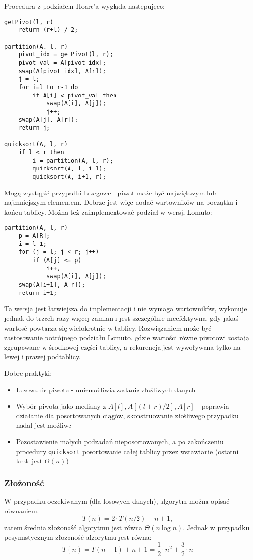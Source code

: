 Procedura z podziałem Hoare'a wygląda następujęco:
\begin{verbatim}
getPivot(l, r)
    return (r+l) / 2;

partition(A, l, r)
    pivot_idx = getPivot(l, r);
    pivot_val = A[pivot_idx];
    swap(A[pivot_idx], A[r]);
    j = l;
    for i=l to r-1 do
        if A[i] < pivot_val then
            swap(A[i], A[j]);
            j++;
    swap(A[j], A[r]);
    return j;

quicksort(A, l, r)
    if l < r then
        i = partition(A, l, r);
        quicksort(A, l, i-1);
        quicksort(A, i+1, r);
\end{verbatim}
Mogą wystąpić przypadki brzegowe - piwot może być największym lub najmniejszym elementem. Dobrze jest więc dodać wartowników na początku i końcu tablicy.
Można też zaimplementować podział w wersji Lomuto:
\begin{verbatim}
partition(A, l, r)
    p = A[R];
    i = l-1;
    for (j = l; j < r; j++)
        if (A[j] <= p)
            i++;
            swap(A[i], A[j]);
    swap(A[i+1], A[r]);
    return i+1;
\end{verbatim}
Ta wersja jest łatwiejsza do implementacji i nie wymaga wartowników, wykonuje jednak do trzech razy więcej zamian i jest szczególnie nieefektywna, gdy jakaś wartość powtarza się wielokrotnie w tablicy.
Rozwiązaniem może być zastosowanie potrójnego podziału Lomuto, gdzie wartości równe piwotowi zostają zgrupowane w środkowej części tablicy, a rekurencja jest wywoływana tylko na lewej i prawej podtablicy.

Dobre praktyki:
\begin{itemize}
    \item Losowanie piwota - uniemożliwia zadanie złośliwych danych
    \item Wybór piwota jako mediany z \( A[l], A[(l+r)/2], A[r] \) - poprawia działanie dla posortowanych ciągów, skonstruowanie złośliwego przypadku nadal jest możliwe
    \item Pozostawienie małych podzadań nieposortowanych, a po zakończeniu procedury \texttt{quicksort} posortowanie całej tablicy przez wstawianie (ostatni krok jest \( \Theta(n) \))
\end{itemize}

\subsubsection*{Złożoność}
W przypadku oczekiwanym (dla losowych danych), algorytm można opisać równaniem:
\[ T(n) = 2 \cdot T(n/2) + n+1, \]
zatem średnia złożoność algorytmu jest równa \( \Theta(n \log n) \).
Jednak w przypadku pesymistycznym złożoność algorytmu jest równa:
\[ T(n) = T(n-1) + n+1 = \frac{1}{2} \cdot n^2 + \frac{3}{2} \cdot n \]


